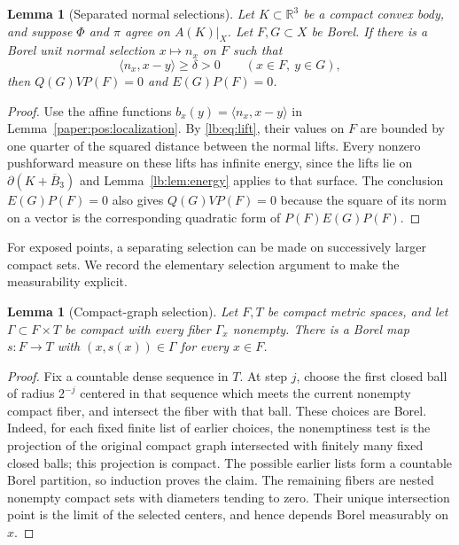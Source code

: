 \documentclass[11pt,letterpaper]{amsart}
\newtheorem{lemma}[theorem]{Lemma}
\theoremstyle{definition}
\theoremstyle{remark}
\numberwithin{equation}{section}
\begin{document}
\begin{lemma}[Separated normal selections]\label{lb:lem:sep}
Let $K\subset\mathbb R^3$ be a compact convex body, and suppose
$\Phi$ and $\pi$ agree on $A(K)|_X$. Let $F,G\subset X$ be
Borel. If there is a Borel unit normal selection
$x\mapsto n_x$ on $F$ such that
\[
             \langle n_x,x-y\rangle\ge\delta>0
             \qquad(x\in F,\ y\in G),
\]
then $Q(G)VP(F)=0$ and $E(G)P(F)=0$.
\end{lemma}
\begin{proof}
Use the affine functions
$b_x(y)=\langle n_x,x-y\rangle$ in
Lemma~\ref{paper:pos:localization}. By \eqref{lb:eq:lift},
their values on $F$ are bounded by one quarter of the squared
distance between the normal lifts. Every nonzero pushforward
measure on these lifts has infinite energy, since the lifts
lie on $\partial(K+\overline B_3)$ and
Lemma~\ref{lb:lem:energy} applies to that surface. The conclusion
$E(G)P(F)=0$ also gives $Q(G)VP(F)=0$ because the square of its
norm on a vector is the corresponding quadratic form of $P(F)E(G)P(F)$.
\end{proof}

For exposed points, a separating selection can be made on
successively larger compact sets. We record the elementary
selection argument to make the measurability explicit.

\begin{lemma}[Compact-graph selection]\label{lb:lem:selection}
Let $F,T$ be compact metric spaces, and let
$\Gamma\subset F\times T$ be compact with every fiber
$\Gamma_x$ nonempty. There is a Borel map $s:F\to T$ with
$(x,s(x))\in\Gamma$ for every $x\in F$.
\end{lemma}
\begin{proof}
Fix a countable dense sequence in $T$. At step $j$, choose
the first closed ball of radius $2^{-j}$ centered in that
sequence which meets the current nonempty compact fiber, and
intersect the fiber with that ball. These choices are Borel.
Indeed, for each fixed finite list of earlier choices, the
nonemptiness test is the projection of the original compact
graph intersected with finitely many fixed closed balls;
this projection is compact. The possible earlier lists form
a countable Borel partition, so induction proves the claim.
The remaining fibers are nested nonempty compact sets with
diameters tending to zero. Their unique intersection point
is the limit of the selected centers, and hence depends
Borel measurably on $x$.
\end{proof}
\end{document}
